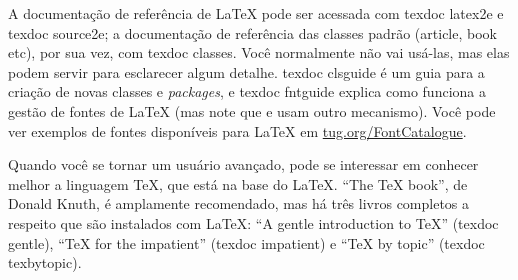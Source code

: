 A documentação de referência de \LaTeX{} pode ser acessada com \textsf{texdoc
latex2e} e \textsf{texdoc source2e}; a documentação de referência das classes
padrão (\textsf{article, book etc}), por sua vez, com \textsf{texdoc classes}.
Você normalmente não vai usá-las, mas elas podem servir para esclarecer algum
detalhe. \textsf{texdoc clsguide} é um guia para a criação de novas classes e
\textit{packages}, e \textsf{texdoc fntguide} explica como funciona a gestão
de fontes de \LaTeX{} (mas note que \LuaLaTeX{} e \XeLaTeX{} usam outro
mecanismo). Você pode ver exemplos de fontes disponíveis para \LaTeX{} em
\url{tug.org/FontCatalogue}.

Quando você se tornar um usuário avançado, pode se interessar em conhecer
melhor a linguagem \TeX{}, que está na base do \LaTeX{}. ``The \TeX{} book'',
de Donald Knuth, é amplamente recomendado, mas há três livros completos a
respeito que são instalados com \LaTeX{}: ``A gentle introduction to \TeX{}''
(\textsf{texdoc gentle}), ``\TeX{} for the impatient'' (\textsf{texdoc
impatient}) e ``\TeX{} by topic'' (\textsf{texdoc texbytopic}).
